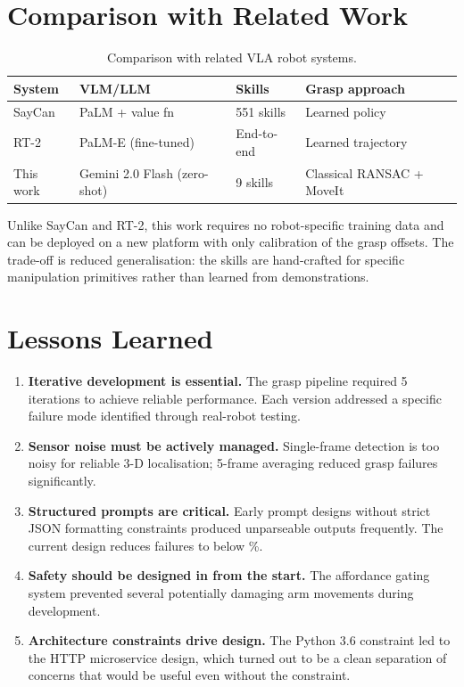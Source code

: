 \section{Comparison with Related Work}

\begin{table}[H]
\centering
\caption{Comparison with related VLA robot systems.}
\label{tab:related_comparison}
\begin{tabularx}{\linewidth}{lXXX}
\toprule
\textbf{System} & \textbf{VLM/LLM} & \textbf{Skills} & \textbf{Grasp approach} \\
\midrule
SayCan \cite{ahn2022saycan} & PaLM + value fn & 551 skills & Learned policy \\
RT-2 \cite{brohan2023rt2}   & PaLM-E (fine-tuned) & End-to-end & Learned trajectory \\
This work                    & Gemini 2.0 Flash (zero-shot) & 9 skills & Classical RANSAC + MoveIt \\
\bottomrule
\end{tabularx}
\end{table}

Unlike SayCan and RT-2, this work requires no robot-specific training data and can be
deployed on a new platform with only calibration of the grasp offsets.
The trade-off is reduced generalisation: the skills are hand-crafted for specific
manipulation primitives rather than learned from demonstrations.

\section{Lessons Learned}

\begin{enumerate}
  \item \textbf{Iterative development is essential.} The grasp pipeline required 5
        iterations to achieve reliable performance. Each version addressed a specific
        failure mode identified through real-robot testing.

  \item \textbf{Sensor noise must be actively managed.} Single-frame detection is
        too noisy for reliable 3-D localisation; 5-frame averaging reduced grasp
        failures significantly.

  \item \textbf{Structured prompts are critical.} Early prompt designs without strict
        JSON formatting constraints produced unparseable outputs frequently. The current
        design reduces failures to below \%.

  \item \textbf{Safety should be designed in from the start.} The affordance gating
        system prevented several potentially damaging arm movements during development.

  \item \textbf{Architecture constraints drive design.} The Python 3.6 constraint
        led to the HTTP microservice design, which turned out to be a clean separation
        of concerns that would be useful even without the constraint.
\end{enumerate}
